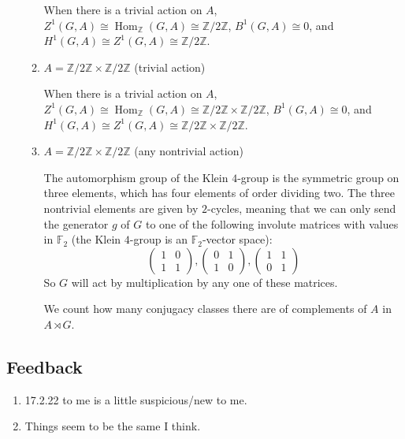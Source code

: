 \documentclass[11pt]{article}
\DeclareMathOperator{\Hom}{Hom}
\begin{document}
\begin{enumerate}
\begin{enumerate}
        When there is a trivial action on $A$, $Z^1(G,A)\cong \Hom_{\mathbb{Z}}(G,A)\cong \mathbb{Z}/2\mathbb{Z}$, $B^1(G,A)\cong 0$, and $H^1(G,A) \cong Z^1(G,A)\cong \mathbb{Z}/2\mathbb{Z}$.
        \item $A = \mathbb{Z}/2\mathbb{Z}\times \mathbb{Z}/2\mathbb{Z}$ (trivial action)

        
        When there is a trivial action on $A$, $Z^1(G,A)\cong \Hom_{\mathbb{Z}}(G,A)\cong \mathbb{Z}/2\mathbb{Z}\times \mathbb{Z}/2\mathbb{Z}$, $B^1(G,A)\cong 0$, and $H^1(G,A) \cong Z^1(G,A)\cong \mathbb{Z}/2\mathbb{Z}\times \mathbb{Z}/2\mathbb{Z}$.
        \item $A =\mathbb{Z}/2\mathbb{Z}\times \mathbb{Z}/2\mathbb{Z}$ (any nontrivial action)

        The automorphism group of the Klein $4$-group is the symmetric group on three elements, which has four elements of order dividing two. The three nontrivial elements are given by $2$-cycles, meaning that we can only send the generator $g$ of $G$ to one of the following involute matrices with values in $\mathbb{F}_2$ (the Klein $4$-group is an $\mathbb{F}_2$-vector space): \[\begin{pmatrix} 1 & 0 \\ 1 & 1 \end{pmatrix},\begin{pmatrix} 0 & 1 \\ 1 & 0 \end{pmatrix},\begin{pmatrix} 1 & 1 \\ 0 & 1 \end{pmatrix}\] So $G$ will act by multiplication by any one of these matrices.

        We count how many conjugacy classes there are of complements of $A$ in $A\rtimes G$.
    \end{enumerate}
\end{enumerate}
\subsection*{Feedback}
\begin{enumerate}
    \item 17.2.22 to me is a little suspicious/new to me.
    \item Things seem to be the same I think.
\end{enumerate}
\end{document}
